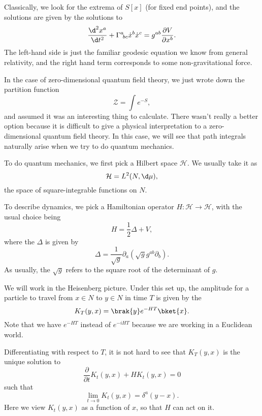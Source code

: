 \documentclass[a4paper]{article}
\begin{document}
Classically, we look for the extrema of $S[x]$ (for fixed end points), and the solutions are given by the solutions to
\[
  \frac{\d^2 x^a}{\d t^2} + \Gamma^a\!_{bc} \dot{x}^b \dot{x}^c = g^{ab} \frac{\partial V}{\partial x^b}.
\]
The left-hand side is just the familiar geodesic equation we know from general relativity, and the right hand term corresponds to some non-gravitational force.

In the case of zero-dimensional quantum field theory, we just wrote down the partition function
\[
  \mathcal{Z} = \int e^{-S},
\]
and assumed it was an interesting thing to calculate. There wasn't really a better option because it is difficult to give a physical interpretation to a zero-dimensional quantum field theory. In this case, we will see that path integrals naturally arise when we try to do quantum mechanics.

To do quantum mechanics, we first pick a Hilbert space $\mathcal{H}$. We usually take it as
\[
  \mathcal{H} = L^2(N, \d \mu),
\]
the space of square-integrable functions on $N$.

To describe dynamics, we pick a Hamiltonian operator $H: \mathcal{H} \to \mathcal{H}$, with the usual choice being
\[
  H = \frac{1}{2} \Delta + V,
\]
where the  $\Delta$\index{$\Delta$} is given by
\[
  \Delta = \frac{1}{\sqrt{g}} \partial_a(\sqrt{g} g^{ab} \partial_b).
\]
As usually, the $\sqrt{g}$ refers to the square root of the determinant of $g$.

We will work in the Heisenberg picture. Under this set up, the amplitude for a particle to travel from $x \in N$ to $y \in N$ in time $T$ is given by the 
\[
  K_T(y, x) = \brak{y} e^{-HT}\bket{x}.
\]
Note that we have $e^{-HT}$ instead of $e^{-iHT}$ because we are working in a Euclidean world.

Differentiating with respect to $T$, it is not hard to see that $K_T(y, x)$ is the unique solution to
\[
  \frac{\partial}{\partial t} K_t(y, x) + H K_t(y, x) = 0
\]
such that
\[
  \lim_{t \to 0} K_t(y, x) = \delta^a (y - x).
\]
Here we view $K_t(y, x)$ as a function of $x$, so that $H$ can act on it.
\end{document}
